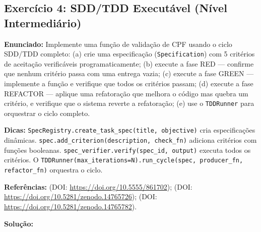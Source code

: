 \subsection{Exercício 4: SDD/TDD Executável (Nível Intermediário)}
\label{sec:ex4}

\textbf{Enunciado:} Implemente uma função de validação de CPF usando o ciclo SDD/TDD completo: (a) crie uma especificação (\texttt{Specification}) com 5 critérios de aceitação verificáveis programaticamente; (b) execute a fase RED — confirme que nenhum critério passa com uma entrega vazia; (c) execute a fase GREEN — implemente a função e verifique que todos os critérios passam; (d) execute a fase REFACTOR — aplique uma refatoração que melhora o código mas quebra um critério, e verifique que o sistema reverte a refatoração; (e) use o \texttt{TDDRunner} para orquestrar o ciclo completo.

\textbf{Dicas:} \texttt{SpecRegistry.create\_task\_spec(title, objective)} cria especificações dinâmicas. \texttt{spec.add\_criterion(description, check\_fn)} adiciona critérios com funções booleanas. \texttt{spec\_verifier.verify(spec\_id, output)} executa todos os critérios. O \texttt{TDDRunner(max\_iterations=N).run\_cycle(spec, producer\_fn, refactor\_fn)} orquestra o ciclo.

\textbf{Referências:} \citet{beck2003tdd} (DOI: \url{https://doi.org/10.5555/861702}); \citet{claro2025sddv1} (DOI: \url{https://doi.org/10.5281/zenodo.14765726}); \citet{claro2025inv006} (DOI: \url{https://doi.org/10.5281/zenodo.14765782}).

\textbf{Solução:}

